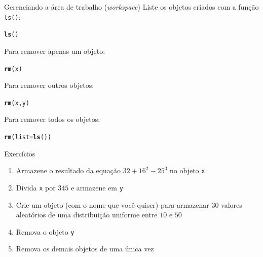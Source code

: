 \documentclass[10pt,handout]{beamer}\usepackage[]{graphicx}\usepackage[]{color}
\makeatletter
\newcommand{\hlstd}[1]{\textcolor[rgb]{0.345,0.345,0.345}{#1}}%
\newcommand{\hlkwc}[1]{\textcolor[rgb]{0.333,0.667,0.333}{#1}}%
\newcommand{\hlkwd}[1]{\textcolor[rgb]{0.737,0.353,0.396}{\textbf{#1}}}%
\newenvironment{kframe}{%
 \def\at@end@of@kframe{}%
 \ifinner\ifhmode%
  \def\at@end@of@kframe{\end{minipage}}%
  \begin{minipage}{\columnwidth}%
 \fi\fi%
 \def\FrameCommand##1{\hskip\@totalleftmargin \hskip-\fboxsep
 \colorbox{shadecolor}{##1}\hskip-\fboxsep
     \hskip-\linewidth \hskip-\@totalleftmargin \hskip\columnwidth}%
 \MakeFramed {\advance\hsize-\width
   \@totalleftmargin\z@ \linewidth\hsize
   \@setminipage}}%
 {\par\unskip\endMakeFramed%
 \at@end@of@kframe}
\newenvironment{knitrout}{}{} %
\makeatother
\begin{document}
\begin{frame}[fragile]{Gerenciando a área de trabalho (\textit{workspace})}
Liste os objetos criados com a função \texttt{ls()}:
\begin{knitrout}\small
{}\color{fgcolor}\begin{kframe}
\begin{alltt}
\hlkwd{ls}\hlstd{()}
\end{alltt}
\end{kframe}
\end{knitrout}
Para remover apenas um objeto:
\begin{knitrout}\small
{}\color{fgcolor}\begin{kframe}
\begin{alltt}
\hlkwd{rm}\hlstd{(x)}
\end{alltt}
\end{kframe}
\end{knitrout}
Para remover outros objetos:
\begin{knitrout}\small
{}\color{fgcolor}\begin{kframe}
\begin{alltt}
\hlkwd{rm}\hlstd{(x, y)}
\end{alltt}
\end{kframe}
\end{knitrout}
Para remover todos os objetos:
\begin{knitrout}\small
{}\color{fgcolor}\begin{kframe}
\begin{alltt}
\hlkwd{rm}\hlstd{(}\hlkwc{list} \hlstd{=} \hlkwd{ls}\hlstd{())}
\end{alltt}
\end{kframe}
\end{knitrout}
\end{frame}

\begin{frame}[fragile]{Exercícios}
  \begin{enumerate}
  \item Armazene o resultado da equação $32 + 16^2 - 25^3$ no objeto
    \verb|x|
  \item Divida \verb|x| por $345$ e armazene em \verb|y|
  \item Crie um objeto (com o nome que você quiser) para armazenar $30$
    valores aleatórios de uma distribuição uniforme entre $10$ e $50$
  \item Remova o objeto \verb|y|
  \item Remova os demais objetos de uma única vez
  \end{enumerate}
\end{frame}
\end{document}
